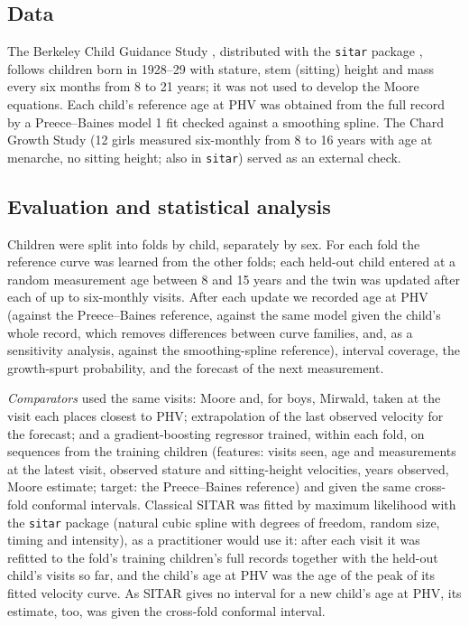 \documentclass[journal]{IEEEtran}
\begin{document}
\subsection{Data}
The Berkeley Child Guidance Study \cite{tuddenham1954}, distributed with the \texttt{sitar}
package \cite{sitarpkg}, follows \TwChildren{} children born in 1928--29 with stature, stem
(sitting) height and mass every six months from 8 to 21 years; it was not used to develop the
Moore equations. Each child's reference age at PHV was obtained from the full record by a
Preece--Baines model 1 fit \cite{preece1978} checked against a smoothing spline. The Chard Growth
Study (12 girls measured six-monthly from 8 to 16 years with age at menarche, no sitting height;
also in \texttt{sitar}) served as an external check.

\subsection{Evaluation and statistical analysis}
Children were split into \TwFolds{} folds by child, separately by sex. For each fold the reference
curve was learned from the other folds; each held-out child entered at a random measurement age
between 8 and 15 years and the twin was updated after each of up to \TwMaxVisits{} six-monthly
visits. After each update we recorded age at PHV (against the Preece--Baines reference, against the
same model given the child's whole record, which removes differences between curve families, and,
as a sensitivity analysis, against the smoothing-spline reference), interval coverage, the
growth-spurt probability, and the forecast of the next measurement.

\emph{Comparators} used the same visits: Moore and, for boys, Mirwald, taken at the visit each
places closest to PHV; extrapolation of the last observed velocity for the forecast; and a
gradient-boosting regressor trained, within each fold, on sequences from the training children
(features: visits seen, age and measurements at the latest visit, observed stature and
sitting-height velocities, years observed, Moore estimate; target: the Preece--Baines reference)
and given the same cross-fold conformal intervals. Classical SITAR \cite{cole2010sitar} was fitted
by maximum likelihood with the \texttt{sitar} package \cite{sitarpkg} (natural cubic spline with
\SitarDF{} degrees of freedom, random size, timing and intensity), as a practitioner would use it:
after each visit it was refitted to the fold's training children's full records together with the
held-out child's visits so far, and the child's age at PHV was the age of the peak of its fitted
velocity curve. As SITAR gives no interval for a new child's age at PHV, its estimate, too, was given
the cross-fold conformal interval.
\end{document}
